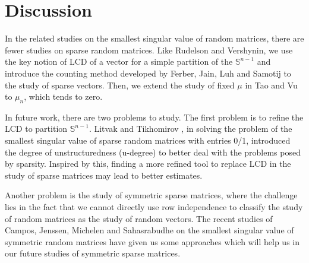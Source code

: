 \documentclass{article}
\numberwithin{equation}{section}
\theoremstyle{plain}
\begin{document}
\section{Discussion}\label{sec4}
In the related studies on the smallest singular value of random matrices, there are fewer studies on sparse random matrices. Like Rudelson and Vershynin, we use the key notion of LCD of a vector for a simple partition of the $\mathbb{S}^{n-1}$ and introduce the counting method developed by Ferber, Jain, Luh and Samotij \cite{MR4273471} to the study of sparse vectors. Then, we extend the study of fixed $\mu$ in Tao and Vu \cite{MR2480613} to $\mu_n$, which tends to zero.
\par
In future work, there are two problems to study. The first problem is to refine the LCD to partition $\mathbb{S}^{n-1}$. Litvak and Tikhomirov \cite{MR4402560}, in solving the problem of the smallest singular value of sparse random matrices with entries 0/1, introduced the degree of unstructuredness (u-degree) to better deal with the problems posed by sparsity. Inspired by this, finding a more refined tool to replace LCD in the study of sparse matrices may lead to better estimates.
\par
Another problem is the study of symmetric sparse matrices, where the challenge lies in the fact that we cannot directly use row independence to classify the study of random matrices as the study of random vectors. The recent studies of Campos, Jenssen, Michelen and Sahasrabudhe \cite{MR4810062} on the smallest singular value of symmetric random matrices have given us some approaches which will help us in our future studies of symmetric sparse matrices.

\printbibliography
\end{document}
